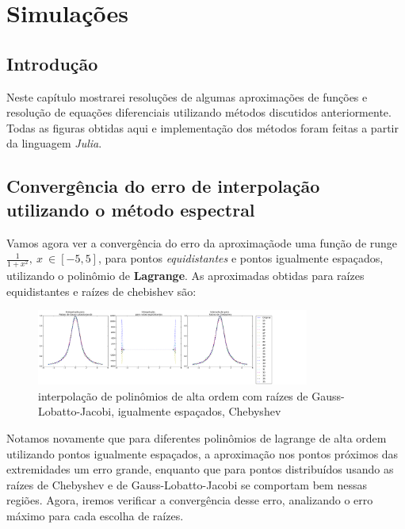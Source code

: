 \chapter{Simulações}
\label{cap:III}
\section{Introdução}
 Neste capítulo mostrarei resoluções de algumas aproximações de funções e resolução de equações diferenciais utilizando métodos discutidos anteriormente. Todas as figuras obtidas aqui e implementação dos métodos foram feitas a partir da linguagem \emph{Julia}.

\section{Convergência do erro de interpolação utilizando o método espectral}
	Vamos agora ver a convergência do erro da aproximaçãode uma função de runge $\frac{1}{1+x^2},\ x\ \in [-5,5]$, para pontos \emph{equidistantes} e pontos igualmente espaçados, utilizando o polinômio de \textbf{Lagrange}.
	As aproximadas obtidas para raízes equidistantes e raízes de chebishev são:\\
\begin{figure}[!ht]
  \includegraphics[width=0.8\textwidth,center]{figuras/interpolacao_todas.png}
  \caption{interpolação de polinômios de alta ordem com raízes de Gauss-Lobatto-Jacobi, igualmente espaçados, Chebyshev}
\end{figure}
Notamos novamente que para diferentes  polinômios de lagrange de alta ordem utilizando pontos igualmente espaçados, a aproximação nos pontos próximos das extremidades um erro  grande, enquanto que para pontos distribuídos usando as raízes de Chebyshev e de Gauss-Lobatto-Jacobi se comportam bem nessas regiões. Agora, iremos verificar a convergência desse erro, analizando o erro máximo para cada escolha de raízes.

